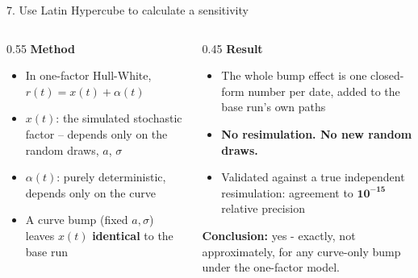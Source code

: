 \documentclass[9pt,aspectratio=169]{beamer}
\begin{document}
\begin{frame}{7. Use Latin Hypercube to calculate a sensitivity}
  \begin{columns}[T]
    \begin{column}{0.55\textwidth}
      \textbf{Method}
      \begin{itemize}
        \item In one-factor Hull-White, $r(t) = x(t) + \alpha(t)$
        \item $x(t)$: the simulated stochastic factor -- depends only on the random draws, $a$, $\sigma$
        \item $\alpha(t)$: purely deterministic, depends only on the curve
        \item A curve bump (fixed $a,\sigma$) leaves $x(t)$ \textbf{identical} to the base run
      \end{itemize}
    \end{column}
    \begin{column}{0.45\textwidth}
      \textbf{Result}
      \begin{itemize}
        \item The whole bump effect is one closed-form number per date, added to the base run's own paths
        \item \textbf{No resimulation. No new random draws.}
        \item Validated against a true independent resimulation: agreement to $\mathbf{10^{-15}}$ relative precision
      \end{itemize}
      \vspace{6pt}
      \textbf{Conclusion:} yes - exactly, not approximately, for any curve-only bump under the one-factor model.
    \end{column}
  \end{columns}
\end{frame}
\end{document}
